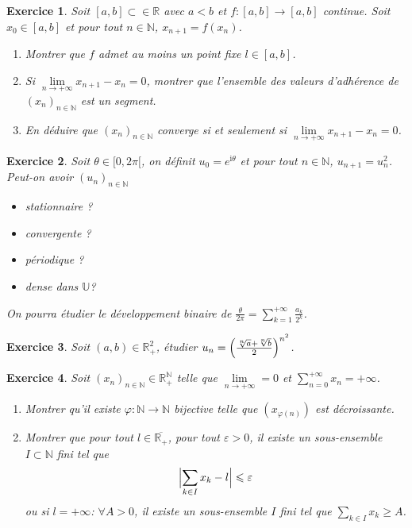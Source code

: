\documentclass[12pt]{article}
\newtheorem{exercise}{Exercice}[section]
\theoremstyle{remark}
\theoremstyle{remark}
\newcommand{\R}{\mathbb{R}}
\newcommand{\N}{\mathbb{N}}
\newcommand{\U}{\mathbb{U}}
\begin{document}
\begin{exercise}
	Soit $[a,b]\subset\in\R$ avec $a<b$ et $f:[a,b]\to[a,b]$ continue. Soit
	$x_{0}\in[a,b]$ et pour tout $n\in\N$, $x_{n+1}=f(x_{n})$.
	\begin{enumerate}
		\item Montrer que $f$ admet au moins un point fixe $l\in[a,b]$.
		\item Si $\lim\limits_{n\to+\infty}x_{n+1}-x_{n}=0$, montrer que
		l'ensemble des valeurs d'adhérence de $(x_{n})_{n\in\N}$ est un segment.
		\item En déduire que $(x_{n})_{n\in\N}$ converge si et seulement si
		$\lim\limits_{n\to+\infty}x_{n+1}-x_{n}=0$.
	\end{enumerate}
\end{exercise}

\begin{exercise}
	Soit $\theta\in[0,2\pi[$, on définit $u_{0}=e^{\mathrm{i}\theta}$ et pour
	tout $n\in\N$, $u_{n+1}=u_{n}^{2}$. Peut-on avoir $(u_{n})_{n\in\N}$
	\begin{itemize}
		\item stationnaire ?
		\item convergente ?
		\item périodique ?
		\item dense dans $\U$?
	\end{itemize}
	On pourra étudier le développement binaire de
	$\frac{\theta}{2\pi}=\sum_{k=1}^{+\infty}\frac{a_{k}}{2^{k}}$.
\end{exercise}

\begin{exercise}
	Soit $(a,b)\in\R_{+}^{2}$, étudier $u_{n}=\Bigl(\frac{\sqrt[n]{a}+\sqrt[n]{b}}{2}\Bigr)^{n^{2}}$.
\end{exercise}

\begin{exercise}
	Soit $(x_{n})_{n\in\N}\in\R_{+}^{\N}$ telle que
	$\lim\limits_{n\to+\infty}=0$ et $\sum_{n=0}^{+\infty}x_{n}=+\infty$.
	\begin{enumerate}
		\item Montrer qu'il existe $\varphi:\N\to\N$ bijective telle que
		$(x_{\varphi(n)})$ est décroissante.
		\item Montrer que pour tout $l\in\overline{\R_{+}}$, pour tout
		$\varepsilon>0$, il existe un sous-ensemble $I\subset\N$ fini tel que
		$$\Bigl\vert\sum_{k\in I}x_{k}-l\Bigr\vert\leqslant\varepsilon$$
		ou si $l=+\infty$: $\forall A>0$, il existe un sous-ensemble $I$ fini
		tel que $\sum_{k\in I}x_{k}\geqslant A$.
	\end{enumerate}
\end{exercise}
\end{document}
